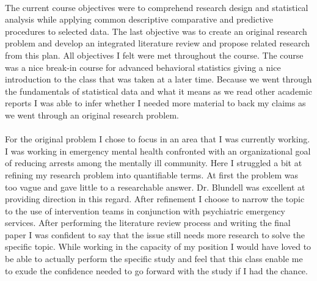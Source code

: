 \documentclass[12pt,titlepage]{article}
\begin{document}
\paragraph {}
The current course objectives were to comprehend research design and statistical analysis while applying common descriptive comparative and predictive procedures to selected data. The last objective was to create an original research problem and develop an integrated literature review and propose related research from this plan. All objectives I felt were met throughout the course. The course was a nice break-in course for advanced behavioral statistics giving a nice introduction to the class that was taken at a later time. Because we went through the fundamentals of statistical data and what it means as we read other academic reports I was able to infer whether I needed more material to back my claims as we went through an original research problem.
\paragraph {}
For the original problem I chose to focus in an area that I was currently working. I was working in emergency mental health confronted with an organizational goal of reducing arrests among the mentally ill community. Here I struggled a bit at refining my research problem into quantifiable terms. At first the problem was too vague and gave little to a researchable answer. Dr. Blundell was excellent at providing direction in this regard. After refinement I choose to narrow the topic to the use of intervention teams in conjunction with psychiatric emergency services. After performing the literature review process and writing the final paper I was confident to say that the issue still needs more research to solve the specific topic. While working in the capacity of my position I would have loved to be able to actually perform the specific study and feel that this class enable me to exude the confidence needed to go forward with the study if I had the chance.%





\end{document}
